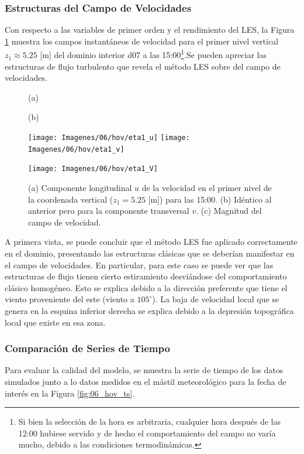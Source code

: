 \subsubsection{Estructuras del Campo de Velocidades}
Con respecto a las variables de primer orden y el rendimiento del LES, la Figura \ref{fig:06_hov_eta1} muestra los campos instantáneos de velocidad para el primer nivel vertical $z_1\approx 5.25$ [m] del dominio interior d07 a las 15:00\footnote{Si bien la selección de la hora es arbitraria, cualquier hora después de las 12:00 hubiese servido y de hecho el comportamiento del campo no varía mucho, debido a las condiciones termodinámicas.}.Se pueden apreciar las estructuras de flujo turbulento que revela el método LES sobre del campo de velocidades. 
\begin{figure}[H]
	\centering
	\begin{minipage}{0.5\linewidth}
		\center\hspace{0.3cm}(a)
	\end{minipage}%
	\begin{minipage}{0.5\linewidth}
		\center\hspace{0.3cm}(b)
	\end{minipage}%
	
	\texttt{[image: Imagenes/06/hov/eta1\_u]}%
	\texttt{[image: Imagenes/06/hov/eta1\_v]}%
	
	
	\texttt{[image: Imagenes/06/hov/eta1\_V]}%
	\caption{(a) Componente longitudinal $u$ de la velocidad en el primer nivel de la coordenada vertical ($z_1=5.25$ [m]) para las 15:00. (b) Idéntico al anterior pero para la componente transversal $v$. (c) Magnitud del campo de velocidad.}
	\label{fig:06_hov_eta1}
\end{figure}
A primera vista, se puede concluir que el método LES fue aplicado correctamente en el dominio, presentando las estructuras clásicas que se deberían manifestar en el campo de velocidades. En particular, para este caso se puede ver que las estructuras de flujo tienen cierto estiramiento desviándose del comportamiento clásico homogéneo. Esto se explica debido a la dirección preferente que tiene el viento proveniente del este (viento a $105^\circ$). La baja de velocidad local que se genera en la esquina inferior derecha se explica debido a la depresión topográfica local que existe en esa zona.
\subsubsection{Comparación de Series de Tiempo}
Para evaluar la calidad del modelo, se muestra la serie de tiempo de los datos simulados junto a lo datos medidos en el mástil meteorológico para la fecha de interés en la Figura \ref{fig:06_hov_ts}. 

